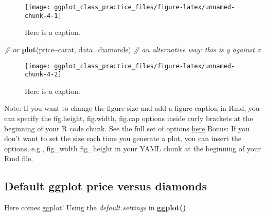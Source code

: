 \documentclass[
]{article}
\newenvironment{Shaded}{\begin{snugshade}}{\end{snugshade}}
\newcommand{\AttributeTok}[1]{\textcolor[rgb]{0.13,0.29,0.53}{#1}}
\newcommand{\CommentTok}[1]{\textcolor[rgb]{0.56,0.35,0.01}{\textit{#1}}}
\newcommand{\FunctionTok}[1]{\textcolor[rgb]{0.13,0.29,0.53}{\textbf{#1}}}
\newcommand{\NormalTok}[1]{#1}
\newcommand{\SpecialCharTok}[1]{\textcolor[rgb]{0.81,0.36,0.00}{\textbf{#1}}}
\newcommand{\StringTok}[1]{\textcolor[rgb]{0.31,0.60,0.02}{#1}}
\begin{document}
\begin{figure}

{\centering \texttt{[image: ggplot\_class\_practice\_files/figure-latex/unnamed-chunk-4-1]} 

}

\caption{Here is a caption.}\label{fig:unnamed-chunk-4-1}
\end{figure}

\begin{Shaded}
\begin{Highlighting}[]
\CommentTok{\# or}
\FunctionTok{plot}\NormalTok{(price}\SpecialCharTok{\textasciitilde{}}\NormalTok{carat, }\AttributeTok{data=}\NormalTok{diamonds) }\CommentTok{\# an alternative way: this is y against x}
\end{Highlighting}
\end{Shaded}

\begin{figure}

{\centering \texttt{[image: ggplot\_class\_practice\_files/figure-latex/unnamed-chunk-4-2]} 

}

\caption{Here is a caption.}\label{fig:unnamed-chunk-4-2}
\end{figure}

Note: If you want to change the figure size and add a figure caption in
Rmd, you can specify the fig.height, fig.width, fig.cap options inside
curly brackets at the beginning of your R code chunk. See the full set
of options \href{https://rpubs.com/Lingling912/870659}{here} Bonus: If
you don't want to set the size each time you generate a plot, you can
insert the options, e.g., fig\_width fig\_height in your YAML chunk at
the beginning of your Rmd file.

\hypertarget{default-ggplot-price-versus-diamonds}{%
\subsection{Default ggplot price versus
diamonds}\label{default-ggplot-price-versus-diamonds}}

Here comes ggplot! Using the \emph{default settings} in
\textbf{ggplot()}

\begin{Shaded}
\end{Shaded}
\end{document}

